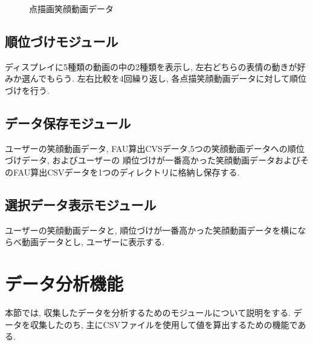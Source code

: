 \begin{figure}[htbp]
    \begin{center}
    \end{center}
    \caption{点描画笑顔動画データ}
    \label{fig:showdata}
\end{figure}

\subsection{順位づけモジュール}
ディスプレイに5種類の動画の中の2種類を表示し, 左右どちらの表情の動きが好みか選んでもらう.
左右比較を4回繰り返し, 各点描笑顔動画データに対して順位づけを行う.

\subsection{データ保存モジュール}
ユーザーの笑顔動画データ, FAU算出CVSデータ,5つの笑顔動画データへの順位づけデータ, およびユーザーの
順位づけが一番高かった笑顔動画データおよびそのFAU算出CSVデータを1つのディレクトリに格納し保存する.

\subsection{選択データ表示モジュール}
ユーザーの笑顔動画データと, 順位づけが一番高かった笑顔動画データを横にならべ動画データとし,
ユーザーに表示する.


\section{データ分析機能}
本節では, 収集したデータを分析するためのモジュールについて説明をする.
データを収集したのち, 主にCSVファイルを使用して値を算出するための機能である.

